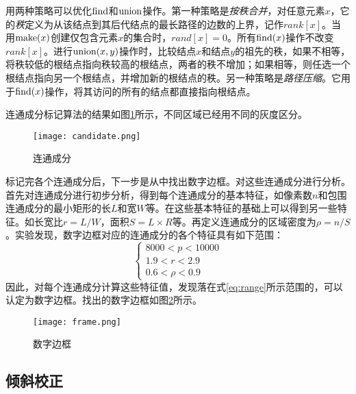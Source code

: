 用两种策略可以优化$\operatorname{find}$和$\operatorname{union}$操作。第一种策略是\emph{按秩合并}，对任意元素$x$，它的\emph{秩}定义为从该结点到其后代结点的最长路径的边数的上界，记作$rank[x]$。当用$\operatorname{make}(x)$创建仅包含元素$x$的集合时，$rand[x]=0$。所有$\operatorname{find}(x)$操作不改变$rank[x]$。进行$\operatorname{union}(x,y)$操作时，比较结点$x$和结点$y$的祖先的秩，如果不相等，将秩较低的根结点指向秩较高的根结点，两者的秩不增加；如果相等，则任选一个根结点指向另一个根结点，并增加新的根结点的秩。另一种策略是\emph{路径压缩}。它用于$\operatorname{find}(x)$操作，将其访问的所有的结点都直接指向根结点。


连通成分标记算法的结果如图\ref{fig:candidate}所示，不同区域已经用不同的灰度区分。
\begin{figure}[h]
  \centering
  \texttt{[image: candidate.png]}
  \caption{连通成分}
  \label{fig:candidate}
\end{figure}


标记完各个连通成分后，下一步是从中找出数字边框。对这些连通成分进行分析。首先对连通成分进行初步分析，得到每个连通成分的基本特征，如像素数$n$和包围连通成分的最小矩形的长$L$和宽$W$等。在这些基本特征的基础上可以得到另一些特征。如长宽比$r=L/W$，面积$S=L\times R$等。再定义连通成分的区域密度为$\rho=n/S$。实验发现，数字边框对应的连通成分的各个特征具有如下范围：
\begin{equation}
  \label{eq:range}
  \begin{cases}
    8000  <  p  <  10000 \\
1.9  <  r  <  2.9 \\
0.6  <  \rho  < 0.9 
  \end{cases}
\end{equation}
因此，对每个连通成分计算这些特征值，发现落在式\eqref{eq:range}所示范围的，可以认定为数字边框。找出的数字边框如图\ref{eq:frame}所示。
\begin{figure}[h]
  \centering
  \texttt{[image: frame.png]}
  \caption{数字边框}
  \label{eq:frame}
\end{figure}

\subsection{倾斜校正}

